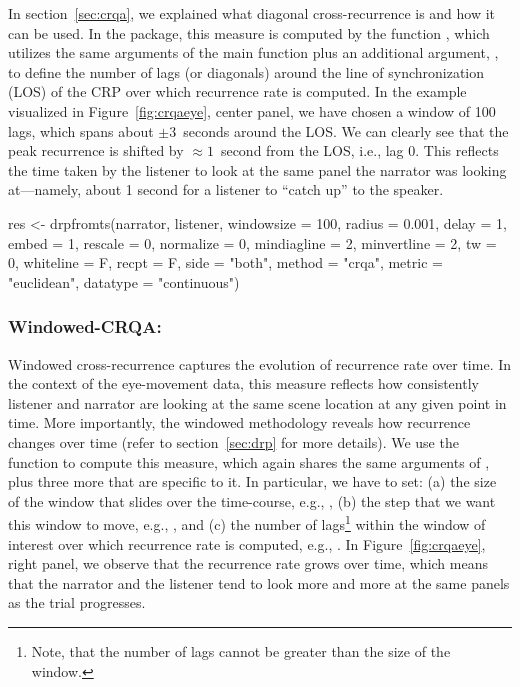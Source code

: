 In section~\ref{sec:crqa}, we explained what diagonal cross-recurrence is and how it can be used. In the  package, this measure is computed by the function , which utilizes the same arguments of the main  function plus an additional argument, , to define the number of lags (or diagonals) around the line of synchronization (LOS) of the CRP over which recurrence rate is computed. In the example visualized in Figure~\ref{fig:crqaeye}, center panel,  we have chosen a window of 100 lags, which spans about $\pm 3$~seconds around the LOS. We can clearly see that the peak recurrence is shifted by $\approx 1$~second from the LOS, i.e., lag 0. This reflects the time taken by the listener to look at the same panel the narrator was looking at---namely, about 1 second for a listener to ``catch up'' to the speaker.

\begin{example}
res <- drpfromts(narrator, listener, windowsize = 100, radius = 0.001, 
                 delay = 1, embed = 1, rescale = 0, normalize = 0, mindiagline = 2,
                 minvertline = 2, tw = 0, whiteline = F, recpt = F, side = "both",
                 method = "crqa", metric = "euclidean", datatype = "continuous")
\end{example}

\subsubsection[Windowed-CRQA: windowdrp]{Windowed-CRQA: }

Windowed cross-recurrence captures the evolution of recurrence rate over time. In the context of the eye-movement data, this measure reflects how consistently listener and narrator are looking at the same scene location at any given point in time. More importantly, the windowed methodology reveals how recurrence changes over time (refer to section~\ref{sec:drp} for more details). We use the function  to compute this measure, which again shares the same arguments of , plus three more that are specific to it. In particular, we have to set: (a) the size of the window that slides over the time-course, e.g., , (b) the step that we want this window to move, e.g., , and (c) the number of lags\footnote{Note, that the number of lags cannot be greater than the size of the window.} within the window of interest over which recurrence rate is computed, e.g., . In Figure~\ref{fig:crqaeye}, right panel, we observe that the recurrence rate grows over time, which means that the narrator and the listener tend to look more and more at the same panels as the trial progresses. 

